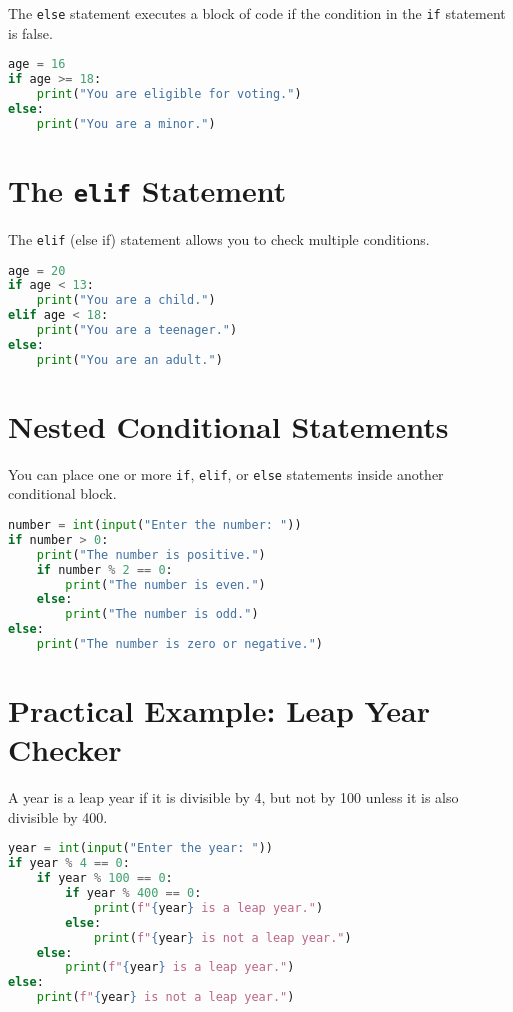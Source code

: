 The \texttt{else} statement executes a block of code if the condition in the \texttt{if} statement is false.

\begin{lstlisting}[language=Python]
age = 16
if age >= 18:
    print("You are eligible for voting.")
else:
    print("You are a minor.")
\end{lstlisting}

\section{The \texttt{elif} Statement}

The \texttt{elif} (else if) statement allows you to check multiple conditions.

\begin{lstlisting}[language=Python]
age = 20
if age < 13:
    print("You are a child.")
elif age < 18:
    print("You are a teenager.")
else:
    print("You are an adult.")
\end{lstlisting}

\section{Nested Conditional Statements}

You can place one or more \texttt{if}, \texttt{elif}, or \texttt{else} statements inside another conditional block.

\begin{lstlisting}[language=Python]
number = int(input("Enter the number: "))
if number > 0:
    print("The number is positive.")
    if number % 2 == 0:
        print("The number is even.")
    else:
        print("The number is odd.")
else:
    print("The number is zero or negative.")
\end{lstlisting}

\section{Practical Example: Leap Year Checker}

A year is a leap year if it is divisible by 4, but not by 100 unless it is also divisible by 400.

\begin{lstlisting}[language=Python]
year = int(input("Enter the year: "))
if year % 4 == 0:
    if year % 100 == 0:
        if year % 400 == 0:
            print(f"{year} is a leap year.")
        else:
            print(f"{year} is not a leap year.")
    else:
        print(f"{year} is a leap year.")
else:
    print(f"{year} is not a leap year.")
\end{lstlisting}

